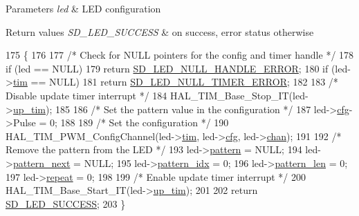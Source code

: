 \begin{DoxyParams}{Parameters}
{\em led} & L\+ED configuration \\
\hline
\end{DoxyParams}

\begin{DoxyRetVals}{Return values}
{\em S\+D\+\_\+\+L\+E\+D\+\_\+\+S\+U\+C\+C\+E\+SS} & on success, error status otherwise \\
\hline
\end{DoxyRetVals}

\begin{DoxyCode}
175 \{
176   
177     \textcolor{comment}{/* Check for NULL pointers for the config and timer handle */}
178     \textcolor{keywordflow}{if} (led == NULL)
179         \textcolor{keywordflow}{return} \mbox{\hyperlink{group___s_d___l_e_d___types_gga4f347a1003b4089de88a7f0fc62c1071ac90640745bacb0ff9863a4d917ae02a1}{SD\_LED\_NULL\_HANDLE\_ERROR}};
180     \textcolor{keywordflow}{if} (led->\mbox{\hyperlink{structsd__led_a6e46bfc6fae939f8fc5ee53ea4551f18}{tim}} == NULL)
181         \textcolor{keywordflow}{return} \mbox{\hyperlink{group___s_d___l_e_d___types_gga4f347a1003b4089de88a7f0fc62c1071afc7e0672820a686720c50ff0aa9d807a}{SD\_LED\_NULL\_TIMER\_ERROR}};
182   
183     \textcolor{comment}{/* Disable update timer interrupt */}
184     HAL\_TIM\_Base\_Stop\_IT(led->\mbox{\hyperlink{structsd__led_a61d4acd84796eefb3b7dead0fae9dabb}{up\_tim}});
185   
186     \textcolor{comment}{/* Set the pattern value in the configuration */}
187     led->\mbox{\hyperlink{structsd__led_acaf3272a1f93d49be9ec4c31804252e6}{cfg}}->Pulse = 0;
188   
189     \textcolor{comment}{/* Set the configuration */}
190     HAL\_TIM\_PWM\_ConfigChannel(led->\mbox{\hyperlink{structsd__led_a6e46bfc6fae939f8fc5ee53ea4551f18}{tim}}, led->\mbox{\hyperlink{structsd__led_acaf3272a1f93d49be9ec4c31804252e6}{cfg}}, led->\mbox{\hyperlink{structsd__led_afb67f3e4e204785118073a96b76614d6}{chan}});
191     
192     \textcolor{comment}{/* Remove the pattern from the LED */}
193     led->\mbox{\hyperlink{structsd__led_a70c2ff7a80dc607b1f146e4aa1494c43}{pattern}} = NULL;
194     led->\mbox{\hyperlink{structsd__led_aa3c569d89c64771860f259ee403b8f6a}{pattern\_next}} = NULL;
195     led->\mbox{\hyperlink{structsd__led_a60a9dc074fe55a93fc9752d68bef8673}{pattern\_idx}} = 0;
196     led->\mbox{\hyperlink{structsd__led_ad68a2de2731d9bf342369de2cdc270c5}{pattern\_len}} = 0;
197     led->\mbox{\hyperlink{structsd__led_a29642221aad4146341708fe32dfb8064}{repeat}} = 0;
198     
199     \textcolor{comment}{/* Enable update timer interrupt */}
200     HAL\_TIM\_Base\_Start\_IT(led->\mbox{\hyperlink{structsd__led_a61d4acd84796eefb3b7dead0fae9dabb}{up\_tim}});
201   
202     \textcolor{keywordflow}{return} \mbox{\hyperlink{group___s_d___l_e_d___types_gga4f347a1003b4089de88a7f0fc62c1071ad3d9e41d4cdb2e47e8754d0a1a3824e2}{SD\_LED\_SUCCESS}};
203 \}
\end{DoxyCode}
\mbox{\label{group___s_d___l_e_d___functions_ga5641c6ed41cf81ecbd2d61731a412667}} 
